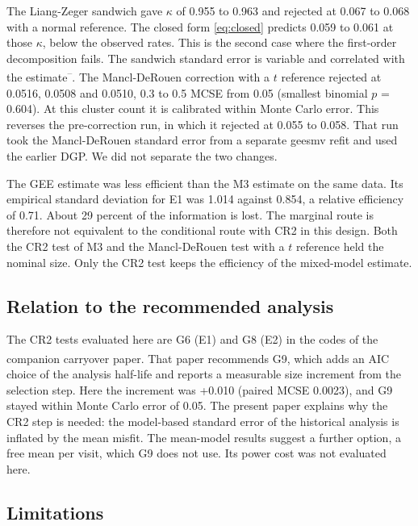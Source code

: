 \documentclass[
  11pt,
]{article}
\begin{document}
The Liang-Zeger sandwich gave \(\kappa\) of
0.955 to 0.963 and rejected at
0.067 to 0.068 with a normal reference.
The closed form \eqref{eq:closed} predicts 0.059 to
0.061 at those \(\kappa\), below the observed rates.
This is the second case where the first-order decomposition fails.
The sandwich standard error is variable and correlated with the
estimate\textsuperscript{--}. The Mancl-DeRouen
correction with a \(t\) reference rejected at 0.0516,
0.0508 and 0.0510,
0.3 to
0.5 MCSE from 0.05 (smallest binomial
\(p\) = 0.604).
At this cluster count it is calibrated within Monte Carlo error. This reverses the pre-correction run, in which it rejected at 0.055 to 0.058. That run took the Mancl-DeRouen standard error from a separate geesmv refit and used the earlier DGP. We did not separate the two changes.

The GEE estimate was less efficient than the M3 estimate on the same
data. Its empirical standard deviation for E1 was
1.014 against 0.854, a relative
efficiency of 0.71. About
29 percent of the
information is lost. The marginal route is therefore not equivalent
to the conditional route with CR2 in this design. Both the CR2 test of
M3 and the Mancl-DeRouen test with a \(t\) reference held the nominal
size. Only the CR2 test keeps the efficiency of the mixed-model
estimate.

\subsection{Relation to the recommended analysis}\label{relation-to-the-recommended-analysis}

The CR2 tests evaluated here are G6 (E1) and G8 (E2) in the codes of
the companion carryover paper\textsuperscript{}. That paper
recommends G9, which adds an AIC choice of the analysis half-life and
reports a measurable size increment from the selection step.
Here the increment was +0.010 (paired MCSE 0.0023), and G9 stayed within Monte Carlo error of 0.05.
The
present paper explains why the CR2 step is needed: the model-based
standard error of the historical analysis is inflated by the mean
misfit. The mean-model results suggest a further option, a free mean
per visit, which G9 does not use. Its power cost was not evaluated
here.

\subsection{Limitations}\label{limitations}
\end{document}
